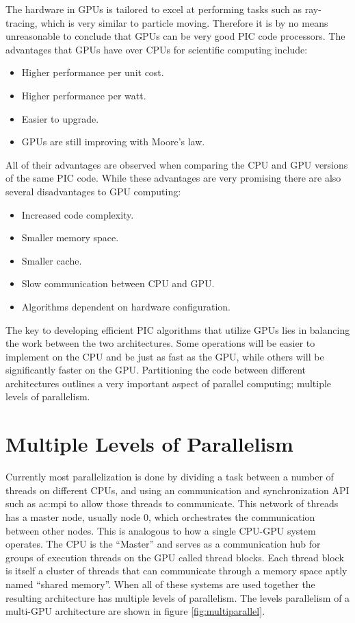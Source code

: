 The hardware in GPUs is tailored to excel at performing tasks such as ray-tracing, which is very similar to particle moving. Therefore it is by no means unreasonable to conclude that GPUs can be very good PIC code processors. The advantages that GPUs have over CPUs for scientific computing include:

\begin{itemize}
	\item Higher performance per unit cost.
	\item Higher performance per watt.
	\item Easier to upgrade.
	\item GPUs are still improving with Moore's law.
\end{itemize}

All of their advantages are observed when comparing the CPU and GPU versions of the same PIC code. While these advantages are very promising there are also several disadvantages to GPU computing:

\begin{itemize}
	\item Increased code complexity.
	\item Smaller memory space.
	\item Smaller cache.
	\item Slow communication between CPU and GPU.
	\item Algorithms dependent on hardware configuration.
\end{itemize}

The key to developing efficient PIC algorithms that utilize GPUs lies in balancing the work between the two architectures. Some operations will be easier to implement on the CPU and be just as fast as the GPU, while others will be significantly faster on the GPU. Partitioning the code between different architectures outlines a very important aspect of parallel computing; multiple levels of parallelism.

	\section{Multiple Levels of Parallelism}
	Currently most parallelization is done by dividing a task between a number of threads on different CPUs, and using an communication and synchronization API such as \gls{ac:mpi} to allow those threads to communicate. This network of threads has a master node, usually node 0, which orchestrates the communication between other nodes. This is analogous to how a single CPU-GPU system operates. The CPU is the ``Master'' and serves as a communication hub for groups of execution threads on the GPU called thread blocks. Each thread block is itself a cluster of threads that can communicate through a memory space aptly named ``shared memory''. When all of these systems are used together the resulting architecture has multiple levels of parallelism. The levels parallelism of a multi-GPU architecture are shown in figure \ref{fig:multiparallel}.

